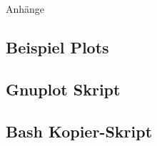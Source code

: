 %
%
%
\begin{appendix}

\newpage

\begin{center}
	\huge{Anhänge}
\end{center}

\normalsize

\begin{landscape}
\section{Beispiel Plots}
\label{lst:plots}

\end{landscape}

\begin{landscape}
\section{Gnuplot Skript}
\label{lst:gnuplot_script}



\end{landscape}

\begin{landscape}
\section{Bash Kopier-Skript}
\label{lst:cp_script}




\end{landscape}
\end{appendix}
